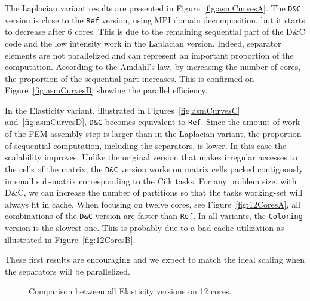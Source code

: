 \documentclass[10pt]{IOS-Book-Article}
\begin{document}
The Laplacian variant results are presented in Figure~\ref{fig:asmCurvesA}. The {\tt D\&C} version is close to the {\tt Ref} version, using MPI domain decomposition, but it starts to decrease after 6 cores.
This is due to the remaining sequential part of the D\&C code and the low intensity work in the Laplacian version.
Indeed, separator elements are not parallelized and can represent an important proportion of the computation.
According to the Amdahl's law, by increasing the number of cores, the proportion of the sequential part increases.
This is confirmed on Figure~\ref{fig:asmCurvesB} showing the parallel efficiency.

In the Elasticity variant, illustrated in Figures~\ref{fig:asmCurvesC} and~\ref{fig:asmCurvesD}, {\tt D\&C} becomes equivalent to {\tt Ref}.
Since the amount of work of the FEM assembly step is larger than in the Laplacian variant, the proportion of sequential computation, including the separators, is lower.
In this case the scalability improves.
Unlike the original version that makes irregular accesses to the cells of the matrix, the {\tt D\&C} version works on matrix cells packed contiguously in small sub-matrix corresponding to the Cilk tasks.
For any problem size, with D\&C, we can increase the number of partitions so that the tasks working-set will always fit in cache.
When focusing on twelve cores, see Figure~\ref{fig:12CoresA}, all combinations of the {\tt D\&C} version are faster than {\tt Ref}.
In all variants, the {\tt Coloring} version is the slowest one.
This is probably due to a bad cache utilization as illustrated in Figure~\ref{fig:12CoresB}.

These first results are encouraging and we expect to match the ideal scaling when the separators will be parallelized.

\begin{figure}[t]
 \caption{Comparison between all Elasticity versions on 12 cores.}
 \label{fig:12Cores}
\end{figure}
\end{document}
